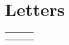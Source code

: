 \par\bigskip
\par\bigskip
\par\bigskip

\section{Letters}

\begin{longtabu}{ X[1,c,m] X[1,c,m] X[1,c,m] }
  \thrule

   &  &  \\ \mrule


\end{longtabu}

